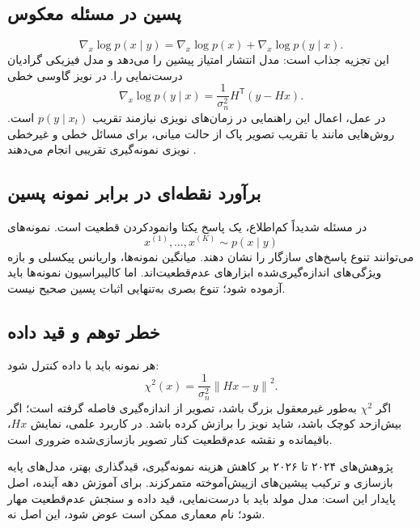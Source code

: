 \documentclass[12pt,openany,oneside]{book}
\newcommand{\norm}[1]{\left\lVert #1\right\rVert}
\newcommand{\trans}{^{\mathsf T}}
\begin{document}
\subsection{پسین در مسئله معکوس}
\begin{equation}
\nabla_x\log p(x\mid y)
=\nabla_x\log p(x)+\nabla_x\log p(y\mid x).
\label{eq:posterior-score}
\end{equation}
این تجزیه جذاب است: مدل انتشار امتیاز پیشین را می‌دهد و مدل فیزیکی گرادیان درست‌نمایی را.
در نویز گاوسی خطی
\begin{equation}
\nabla_x\log p(y\mid x)=\frac{1}{\sigma_n^2}H\trans(y-Hx).
\end{equation}
در عمل، اعمال این راهنمایی در زمان‌های نویزی نیازمند تقریب \(p(y\mid x_t)\) است. روش‌هایی مانند  با تقریب تصویر پاک از حالت میانی،
برای مسائل خطی و غیرخطی نویزی نمونه‌گیری تقریبی انجام می‌دهند \cite{chung2023dps}.

\subsection{برآورد نقطه‌ای در برابر نمونه پسین}
در مسئله شدیداً کم‌اطلاع، یک پاسخ یکتا وانمودکردن قطعیت است. نمونه‌های
\begin{equation}
x^{(1)},\ldots,x^{(K)}\sim p(x\mid y)
\end{equation}
می‌توانند تنوع پاسخ‌های سازگار را نشان دهند. میانگین نمونه‌ها، واریانس پیکسلی و بازه ویژگی‌های اندازه‌گیری‌شده ابزارهای عدم‌قطعیت‌اند.
اما کالیبراسیون نمونه‌ها باید آزموده شود؛ تنوع بصری به‌تنهایی اثبات پسین صحیح نیست.

\subsection{خطر توهم و قید داده}
هر نمونه باید با داده کنترل شود:
\begin{equation}
\chi^2(x)=\frac{1}{\sigma_n^2}\norm{Hx-y}^2.
\end{equation}
اگر \(\chi^2\) به‌طور غیرمعقول بزرگ باشد، تصویر از اندازه‌گیری فاصله گرفته است؛ اگر بیش‌ازحد کوچک باشد، شاید نویز را برازش کرده باشد.
در کاربرد علمی، نمایش \(Hx\)، باقیمانده و نقشه عدم‌قطعیت کنار تصویر بازسازی‌شده ضروری است.

\begin{futurebox}
پژوهش‌های ۲۰۲۴ تا ۲۰۲۶ بر کاهش هزینه نمونه‌گیری، قیدگذاری بهتر، مدل‌های پایه بازسازی و ترکیب پیشین‌های ازپیش‌آموخته متمرکزند.
برای آموزش دهه آینده، اصل پایدار این است: مدل مولد باید با درست‌نمایی، قید داده و سنجش عدم‌قطعیت مهار شود؛ نام معماری ممکن است عوض شود، این اصل نه.
\end{futurebox}
\end{document}
